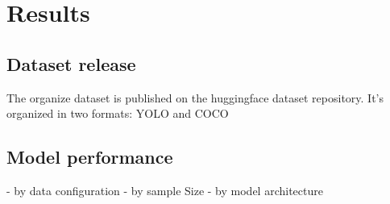 \section{Results}
\lipsum[2]
\lipsum[3]

\subsection{Dataset release}

The organize dataset is published on the huggingface dataset repository. It's organized in two formats: YOLO and COCO

\subsection{Model performance}

- by data configuration
- by sample Size
- by model architecture

